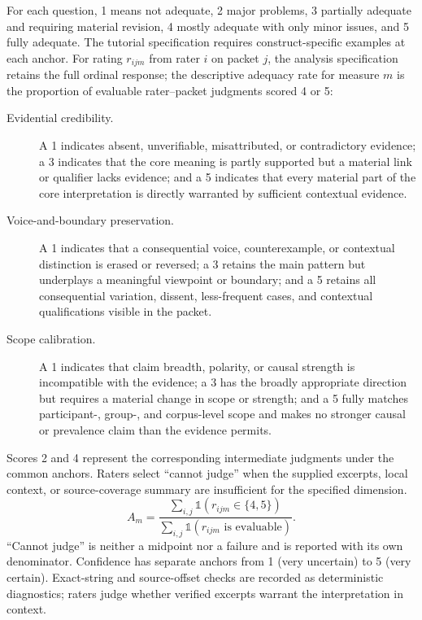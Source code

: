 For each question, 1 means not adequate, 2 major problems, 3 partially adequate and requiring material revision, 4 mostly adequate with only minor issues, and 5 fully adequate. The tutorial specification requires construct-specific examples at each anchor. For rating $r_{ijm}$ from rater $i$ on packet $j$, the analysis specification retains the full ordinal response; the descriptive adequacy rate for measure $m$ is the proportion of evaluable rater--packet judgments scored 4 or 5:
\begin{description}
    \item[Evidential credibility.] A 1 indicates absent, unverifiable, misattributed, or contradictory evidence; a 3 indicates that the core meaning is partly supported but a material link or qualifier lacks evidence; and a 5 indicates that every material part of the core interpretation is directly warranted by sufficient contextual evidence.
    \item[Voice-and-boundary preservation.] A 1 indicates that a consequential voice, counterexample, or contextual distinction is erased or reversed; a 3 retains the main pattern but underplays a meaningful viewpoint or boundary; and a 5 retains all consequential variation, dissent, less-frequent cases, and contextual qualifications visible in the packet.
    \item[Scope calibration.] A 1 indicates that claim breadth, polarity, or causal strength is incompatible with the evidence; a 3 has the broadly appropriate direction but requires a material change in scope or strength; and a 5 fully matches participant-, group-, and corpus-level scope and makes no stronger causal or prevalence claim than the evidence permits.
\end{description}
Scores 2 and 4 represent the corresponding intermediate judgments under the common anchors. Raters select ``cannot judge'' when the supplied excerpts, local context, or source-coverage summary are insufficient for the specified dimension.
\begin{equation}
A_m =
\frac{\sum_{i,j}\mathbb{1}\!\left(r_{ijm}\in\{4,5\}\right)}
     {\sum_{i,j}\mathbb{1}\!\left(r_{ijm}\text{ is evaluable}\right)}.
\end{equation}
``Cannot judge'' is neither a midpoint nor a failure and is reported with its own denominator. Confidence has separate anchors from 1 (very uncertain) to 5 (very certain). Exact-string and source-offset checks are recorded as deterministic diagnostics; raters judge whether verified excerpts warrant the interpretation in context.

